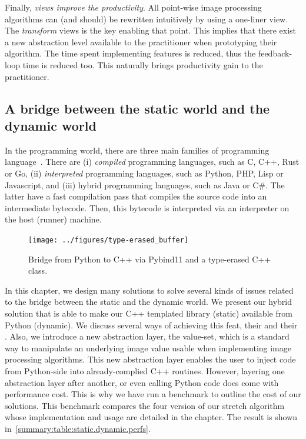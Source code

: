 Finally, \emph{views improve the productivity}. All point-wise image processing algorithms can (and should) be rewritten
intuitively by using a one-liner view. The \emph{transform} views is the key enabling that point. This implies that
there exist a new abstraction level available to the practitioner when prototyping their algorithm. The time spent
implementing features is reduced, thus the feedback-loop time is reduced too. This naturally brings productivity gain to
the practitioner.


\subsection*{A bridge between the static world and the dynamic world}


In the programming world, there are three main families of programming language~\parencite{prechelt.2000.comparison}.
There are (i) \emph{compiled} programming languages, such as C, C++, Rust or Go, (ii) \emph{interpreted} programming
languages, such as Python, PHP, Lisp or Javascript, and (iii) hybrid programming languages, such as Java or C\#. The
latter have a fast compilation pass that compiles the source code into an intermediate bytecode. Then, this bytecode is
interpreted via an interpreter on the host (runner) machine.

\begin{figure}[htbp]
  \centering
  \texttt{[image: ../figures/type-erased\_buffer]}
  \caption[]{Bridge from Python to C++ via Pybind11 and a type-erased C++ class.}
  \label{summary:fig:type-erased.buffer}
\end{figure}

In this chapter, we design many solutions to solve several kinds of issues related to the bridge between the static and
the dynamic world. We present our hybrid solution that is able to make our C++ templated library (static) available from
Python (dynamic). We discuss several ways of achieving this feat, their \pros and their \cons. Also, we introduce a new
abstraction layer, the value-set, which is a standard way to manipulate an underlying image value usable when
implementing image processing algorithms. This new abstraction layer enables the user to inject code from Python-side
into already-complied C++ routines. However, layering one abstraction layer after another, or even calling Python code
does come with performance cost. This is why we have run a benchmark to outline the cost of our solutions. This
benchmark compares the four version of our stretch algorithm whose implementation and usage are detailed in the chapter.
The result is shown in~\cref{summary:table:static.dynamic.perfs}.

